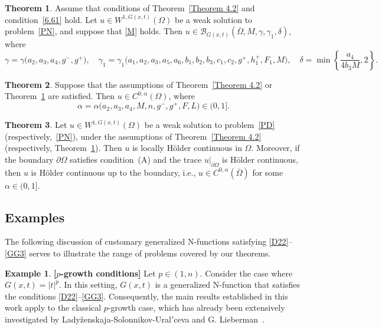 \documentclass[10pt,reqno]{amsart}
\newcommand *\w{^\wedge}
\newcommand{\cprime}{\('\)}
\theoremstyle{definition}
\newtheorem{example}[thm]{Example}
\newtheorem{theorem}{Theorem}[section]
\numberwithin{equation}{section}
\begin{document}
\begin{theorem}\label{Theorem 4.21}
Assume that conditions of Theorem~\ref{Theorem 4.2} and condition~\eqref{6.61} hold. Let \( u \in W^{1,G(x,t)}(\Omega) \) be a weak solution to problem~\eqref{PN}, and suppose that \eqref{M} holds. Then \( u \in \mathcal{B}_{G(x,t)}(\overline{\Omega}, M, \gamma, \gamma_1, \delta) \), where
\[
\gamma = \gamma\big(a_2, a_3, a_4,g^-, g^+\big), \quad
\gamma_1 = \gamma_1\big(a_1,a_2, a_3, a_5,a_6, b_1,b_2,b_3,c_1,c_2, g^+, h^+_1,F_1,M\big), \quad
\delta = \min\left\{ \frac{a_4}{4 b_3M}, 2 \right\}.
\]
\end{theorem}

\begin{theorem}\label{Theorem 4.3}
Suppose that the assumptions of Theorem~\ref{Theorem 4.2} or Theorem~\ref{Theorem 4.21} are satisfied. Then \( u \in C^{0,\alpha}(\Omega) \), where
\[
\alpha = \alpha\big(a_2, a_3, a_4,M, n, g^-, g^+, F, L\big) \in (0,1].
\]
\end{theorem}

\begin{theorem}\label{Theorem 4.4}
Let \( u \in W^{1,G(x,t)}(\Omega) \) be a weak solution to problem~\eqref{PD} (respectively,~\eqref{PN}), under the assumptions of Theorem~\ref{Theorem 4.2} (respectively, Theorem~\ref{Theorem 4.21}). Then \( u \) is locally Hölder continuous in \( \Omega \). Moreover, if the boundary \( \partial \Omega \) satisfies condition~(A) and the trace \( u|_{\partial \Omega} \) is Hölder continuous, then \( u \) is Hölder continuous up to the boundary, i.e., \( u \in C^{0,\alpha}(\overline{\Omega}) \) for some \( \alpha \in (0,1] \).
\end{theorem}
\subsection{Examples}
The following discussion of customary generalized \textnormal{N}-functions satisfying \eqref{D22}--\eqref{GG3} serves to illustrate the range of problems covered by our theorems.


\begin{example}{\rm\bf{[\(p\)-growth conditions]}} \label{ex1}
Let \(p \in (1, n)\). Consider the case where \(G(x,t) = |t|^p\). In this setting, \(G(x,t)\) is a generalized \textnormal{N}-function that satisfies the conditions \eqref{D22}--\eqref{GG3}. Consequently, the main results established in this work apply to the classical \(p\)-growth case, which has already been extensively investigated by Lady{\v{z}}enskaja-Solonnikov-Ural{\cprime}ceva \cite{OL} and G. Lieberman~\cite{Li1988}.
\end{example}
\end{document}
